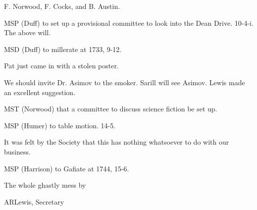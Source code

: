 \documentclass[12pt]{article}
\begin{document}
F. Norwood, F. Cocks, and B. Austin.

MSP (Duff) to set up a provisional committee to look into the Dean Drive. 10-4-i. The above will.

MSD (Duff) to millerate at 1733, 9-12.

Pat just came in with a stolen poster.

We should invite Dr. Asimov to the smoker. Sarill will see Asimov. Lewis made an excellent suggestion.

MST (Norwood) that a committee to discuss science fiction be set up.

MSP (Humer) to table motion. 14-5.

It was felt by the Society that this has nothing whatsoever to do with our business.

MSP (Harrison) to Gafiate at 1744, 15-6.

\vspace{12pt}

\centerline{The whole ghastly mess by}
\centerline{ARLewis, Secretary}
\end{document}
